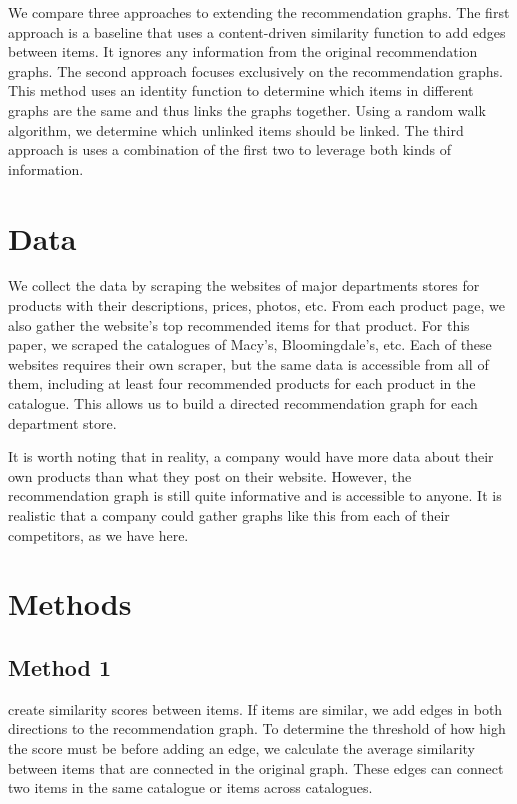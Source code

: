 \documentclass[10pt]{article}
\begin{document}
We compare three approaches to extending the recommendation graphs. The
first approach is a baseline that uses a content-driven similarity function
to add edges between items. It ignores any information from the original
recommendation graphs. The second approach focuses exclusively on the
recommendation graphs. This method uses an identity function to determine
which items in different graphs are the same and thus links the graphs
together. Using a random walk algorithm, we determine which unlinked items
should be linked. The third approach is uses a combination of the first two
to leverage both kinds of information.

\section*{Data}
We collect the data by scraping the websites of major departments stores for
products with their descriptions, prices, photos, etc. From each product
page, we also gather the website's top recommended items for that product.
For this paper, we scraped the catalogues of Macy's, Bloomingdale's, etc.
Each of these websites requires their own scraper, but the same data is
accessible from all of them, including at least four recommended products
for each product in the catalogue. This allows us to build a directed
recommendation graph for each department store. 

It is worth noting that in reality, a company would have more data about
their own products than what they post on their website. However, the
recommendation graph is still quite informative and is accessible to anyone.
It is realistic that a company could gather graphs like this from each of
their competitors, as we have here.

\section*{Methods}
\subsection*{Method 1}
create similarity scores between items. If items are similar, we add edges
in both directions to the recommendation graph. To determine the threshold
of how high the score must be before adding an edge, we calculate the
average similarity between items that are connected in the original graph.
These edges can connect two items in the same catalogue or items across
catalogues.
\end{document}
